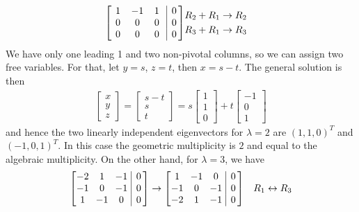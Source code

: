 \begin{solution}
\begin{align*}
\left[\begin{array}{@{\,}wc{10pt}wc{10pt}wc{10pt}|c@{\,}}
1 & -1 & 1 & 0 \\
0 & 0 & 0 & 0 \\
0 & 0 & 0 & 0
\end{array}\right] & \begin{aligned}
R_2 + R_1 &\to R_2 \\
R_3 + R_1 &\to R_3 \\
\end{aligned}
\end{align*}
We have only one leading 1 and two non-pivotal columns, so we can assign two free variables. For that, let $y = s$, $z = t$, then $x = s - t$. The general solution is then
\begin{align*}
\begin{bmatrix}
x \\
y \\ 
z
\end{bmatrix}
=
\begin{bmatrix}
s - t \\
s \\ 
t
\end{bmatrix}
=
s
\begin{bmatrix}
1 \\
1 \\
0
\end{bmatrix}
+ t 
\begin{bmatrix}
-1 \\
0 \\
1
\end{bmatrix}
\end{align*}
and hence the two linearly independent eigenvectors for $\lambda = 2$ are $(1,1,0)^T$ and $(-1,0,1)^T$. In this case the geometric multiplicity is $2$ and equal to the algebraic multiplicity. On the other hand, for $\lambda = 3$, we have
\begin{align*}
\left[\begin{array}{@{\,}wc{10pt}wc{10pt}wc{10pt}|c@{\,}}
-2 & 1 & -1 & 0 \\
-1 & 0 & -1 & 0 \\
1 & -1 & 0 & 0
\end{array}\right] 
&\to    
\left[\begin{array}{@{\,}wc{10pt}wc{10pt}wc{10pt}|c@{\,}}
1 & -1 & 0 & 0 \\
-1 & 0 & -1 & 0 \\
-2 & 1 & -1 & 0 
\end{array}\right] & R_1 \leftrightarrow R_3 \\

\end{align*}
\end{solution}
